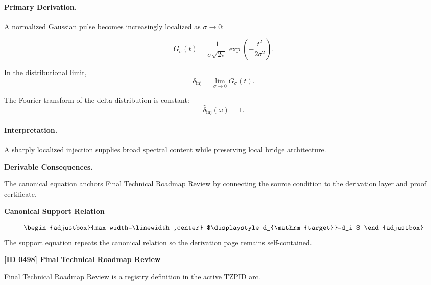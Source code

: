 \paragraph{Primary Derivation.}
A normalized Gaussian pulse becomes increasingly localized as $\sigma\to0$:

\begin{equation}
G_{\sigma}(t)
=
\frac{1}{\sigma\sqrt{2\pi}}
\exp\left(
-\frac{t^2}{2\sigma^2}
\right).
\end{equation}

In the distributional limit,
\begin{equation}
\delta_{\mathrm{inj}}
=
\lim_{\sigma\to0}G_{\sigma}(t).
\end{equation}

The Fourier transform of the delta distribution is constant:
\begin{equation}
\boxed{
\widehat{\delta}_{\mathrm{inj}}(\omega)=1.
}
\end{equation}

\paragraph{Interpretation.}
A sharply localized injection supplies broad spectral content while preserving local bridge architecture.

\par\vspace{0.35em}
\noindent\textbf{Derivable Consequences.}\quad
\begingroup
\footnotesize
\raggedright
The canonical equation anchors Final Technical Roadmap Review by connecting the source condition to the derivation layer and proof certificate.
\par\endgroup

\noindent\textbf{Canonical Support Relation}\par
\[
\begin{adjustbox}{max width=\linewidth,center}
$\displaystyle
d_{\mathrm{target}}=d_i
$
\end{adjustbox}
\]
\noindent The support equation repeats the canonical relation so the derivation page remains self-contained.\par

\clearpage
\noindent\textbf{[ID 0498] Final Technical Roadmap Review}\par
\vspace{0.35em}
\begingroup\small
{}
Final Technical Roadmap Review is a registry definition in the active TZPID arc.


